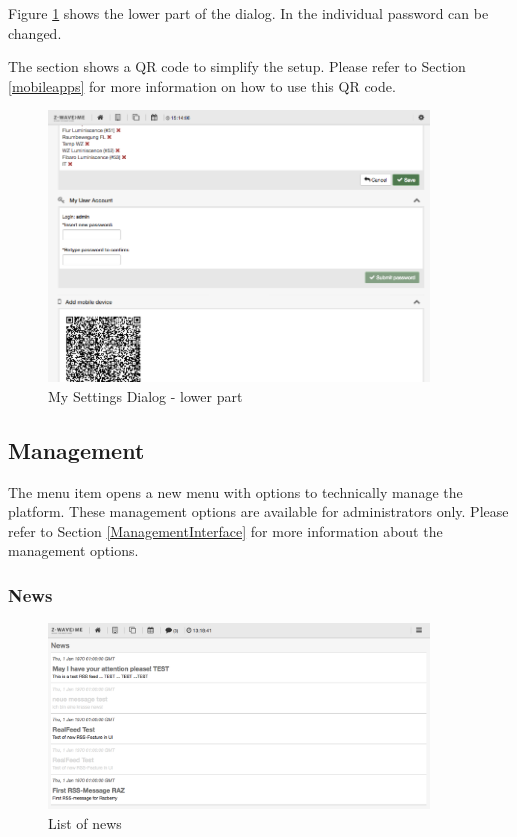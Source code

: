 Figure \ref{device5} shows the lower part of the  dialog. In  
the individual password can be changed.

The section  shows a QR code to simplify the setup. Please refer to 
Section \ref{mobileapps} for more information on how to use this QR code.


\begin{figure}
\begin{center}
\includegraphics[width=0.9\textwidth]{pngs/cap4/device5.png}
\caption{My Settings Dialog - lower part}
\label{device5}
\end{center}
\end{figure}

\subsection{Management}

The menu item  opens a new menu with options to technically manage the platform. 
These management options are available for administrators only. Please refer to Section 
\ref{ManagementInterface} for more information about the management options.

\subsubsection{News}
\label{news}

\begin{figure}
\begin{center}
\includegraphics[width=0.9\textwidth]{pngs/cap4/news2.png}
\caption{List of \zway news}
\label{news2}
\end{center}
\end{figure}

